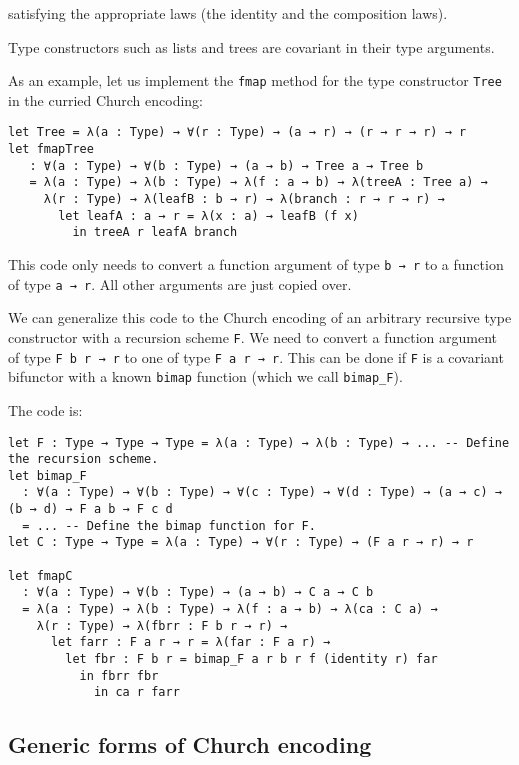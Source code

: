 satisfying the appropriate laws (the identity and the composition laws).


Type constructors such as lists and trees are covariant in their type arguments.


As an example, let us implement the \lstinline!fmap! method for the type constructor \lstinline!Tree! in the curried Church encoding:


\begin{lstlisting}[language=Dhall]
let Tree = λ(a : Type) → ∀(r : Type) → (a → r) → (r → r → r) → r
let fmapTree
   : ∀(a : Type) → ∀(b : Type) → (a → b) → Tree a → Tree b
   = λ(a : Type) → λ(b : Type) → λ(f : a → b) → λ(treeA : Tree a) →
     λ(r : Type) → λ(leafB : b → r) → λ(branch : r → r → r) →
       let leafA : a → r = λ(x : a) → leafB (f x)
         in treeA r leafA branch
\end{lstlisting}


This code only needs to convert a function argument of type \lstinline!b → r! to a function of type \lstinline!a → r!.
All other arguments are just copied over.


We can generalize this code to the Church encoding of an arbitrary recursive type constructor with a recursion scheme \lstinline!F!.
We need to convert a function argument of type \lstinline!F b r → r! to one of type \lstinline!F a r → r!.
This can be done if \lstinline!F! is a covariant bifunctor with a known \lstinline!bimap! function (which we call \lstinline!bimap_F!).


The code is:


\begin{lstlisting}[language=Dhall]
let F : Type → Type → Type = λ(a : Type) → λ(b : Type) → ... -- Define the recursion scheme.
let bimap_F
  : ∀(a : Type) → ∀(b : Type) → ∀(c : Type) → ∀(d : Type) → (a → c) → (b → d) → F a b → F c d
  = ... -- Define the bimap function for F.
let C : Type → Type = λ(a : Type) → ∀(r : Type) → (F a r → r) → r

let fmapC
  : ∀(a : Type) → ∀(b : Type) → (a → b) → C a → C b
  = λ(a : Type) → λ(b : Type) → λ(f : a → b) → λ(ca : C a) →
    λ(r : Type) → λ(fbrr : F b r → r) →
      let farr : F a r → r = λ(far : F a r) →
        let fbr : F b r = bimap_F a r b r f (identity r) far
          in fbrr fbr
            in ca r farr
\end{lstlisting}


\subsection{Generic forms of Church encoding}


